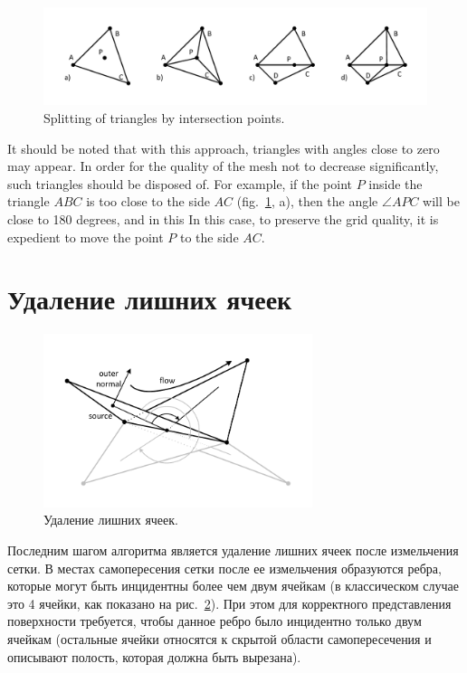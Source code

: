 \documentclass[
11pt,%
tightenlines,%
twoside,%
onecolumn,%
nofloats,%
nobibnotes,%
nofootinbib,%
superscriptaddress,%
noshowpacs,%
centertags]%
{revtex4}
\begin{document}
\begin{figure}[h]
\includegraphics[width=1.0\textwidth]{pics/pic_split_s.pdf}
\caption{Splitting of triangles by intersection points.}\label{fig:pic_split_s}
\end{figure}

It should be noted that with this approach, triangles with angles close to zero may appear.
In order for the quality of the mesh not to decrease significantly, such triangles should be disposed of.
For example, if the point $P$ inside the triangle $ABC$ is too close to the side $AC$ (fig.~\ref{fig:pic_split_s}, a), then the angle $\angle APC$ will be close to 180 degrees, and in this In this case, to preserve the grid quality, it is expedient to move the point $P$ to the side $AC$.

\section{Удаление лишних ячеек}

\begin{figure}[h]
\includegraphics[width=0.7\textwidth]{pics/pic_del_extra_s.pdf}
\caption{Удаление лишних ячеек.}\label{fig:pic_del_extra_s}
\end{figure}

Последним шагом алгоритма является удаление лишних ячеек после измельчения сетки.
В местах самопересения сетки после ее измельчения образуются ребра, которые могут быть инцидентны более чем двум ячейкам (в классическом случае это 4 ячейки, как показано на рис.~\ref{fig:pic_del_extra_s}).
При этом для корректного представления поверхности требуется, чтобы данное ребро было инцидентно только двум ячейкам (остальные ячейки относятся к скрытой области самопересечения и описывают полость, которая должна быть вырезана).
\end{document}
